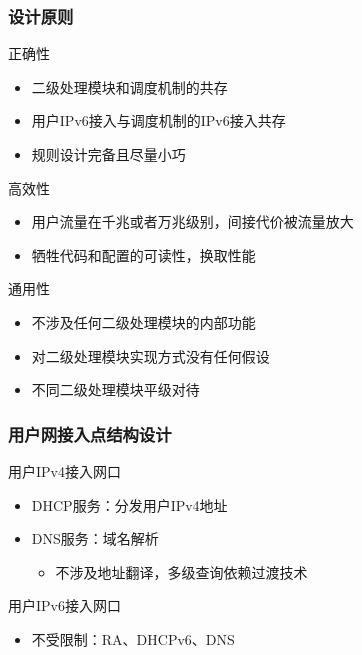 \documentclass{beamer}
\begin{document}
\begin{frame}
  \frametitle{设计原则}

  \begin{block}{正确性}
    \begin{itemize}
    \item 二级处理模块和调度机制的共存
    \item 用户IPv6接入与调度机制的IPv6接入共存
    \item 规则设计完备且尽量小巧
    \end{itemize}
  \end{block}

  \begin{block}{高效性}
    \begin{itemize}
    \item 用户流量在千兆或者万兆级别，间接代价被流量放大
    \item 牺牲代码和配置的可读性，换取性能
    \end{itemize}
  \end{block}

  \begin{block}{通用性}
    \begin{itemize}
    \item 不涉及任何二级处理模块的内部功能
    \item 对二级处理模块实现方式没有任何假设
    \item 不同二级处理模块平级对待
    \end{itemize}
  \end{block}
\end{frame}

\begin{frame}
  \frametitle{用户网接入点结构设计}
  \begin{block}{用户IPv4接入网口}
    \begin{itemize}
    \item DHCP服务：分发用户IPv4地址
    \item DNS服务：域名解析
      \begin{itemize}
      \item 不涉及地址翻译，多级查询依赖过渡技术
      \end{itemize}
    \end{itemize}
  \end{block}

  \begin{block}{用户IPv6接入网口}
    \begin{itemize}
    \item 不受限制：RA、DHCPv6、DNS
    \end{itemize}
  \end{block}
\end{frame}
\end{document}
